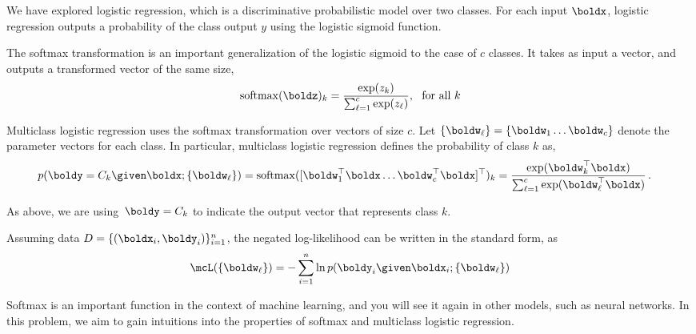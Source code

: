 \documentclass[submit]{harvardml}
\begin{document}
\newpage
\begin{problem}
%
  We have explored logistic regression, which is a discriminative
  probabilistic model over two classes. For each input $\boldx$,
  logistic regression outputs a probability of the class output $y$
  using the logistic sigmoid function.

  The softmax transformation is an important generalization of the logistic
  sigmoid to the case of $c$ classes. It takes as input a vector, and
  outputs a transformed vector of the same size,
%
  \[ \mathrm{softmax}(\boldz)_k =\frac{\exp(z_k)}{\sum_{\ell=1}^c \exp(z_{\ell})}, \ \ \text{for all $k$}\]

Multiclass logistic regression uses the softmax transformation over vectors of size $c$. Let $\{\boldw_{\ell}\} = \{\boldw_1 \ldots \boldw_c \} $
denote the parameter vectors for each class.
In particular,  multiclass logistic regression 
defines the probability of class $k$ as,
%
\begin{align*}
  p(\boldy=C_k \given \boldx; \{\boldw_{\ell}\})
  &= \mathrm{softmax}([\boldw_1^{\top}\boldx \ldots \boldw_c^{\top} \boldx]^\top)_k =  \frac{ \exp( \boldw_k^{\top}\boldx ) }
  {  \sum_{\ell=1}^c \exp( \boldw_{\ell}^{\top}\boldx ) }\,.
\end{align*}

\noindent  As above, we are
using~$\boldy = {C_{k}}$ to indicate the output 
vector that represents class $k$.

Assuming data $D = \{(\boldx_i, \boldy_i)\}_{i=1}^n$,
the negated log-likelihood  can be written in the standard form, as
%
\[\mcL(\{\boldw_{\ell}\}) = - \sum_{i=1}^n \ln  p(\boldy_i \given \boldx_i; \{\boldw_{\ell}\}) \]


Softmax is an important function in the context of machine learning,
and you will see it again in other models, such as neural networks.
In this problem, we aim to gain intuitions into the properties of
softmax and multiclass logistic regression.


\end{problem}
\end{document}
